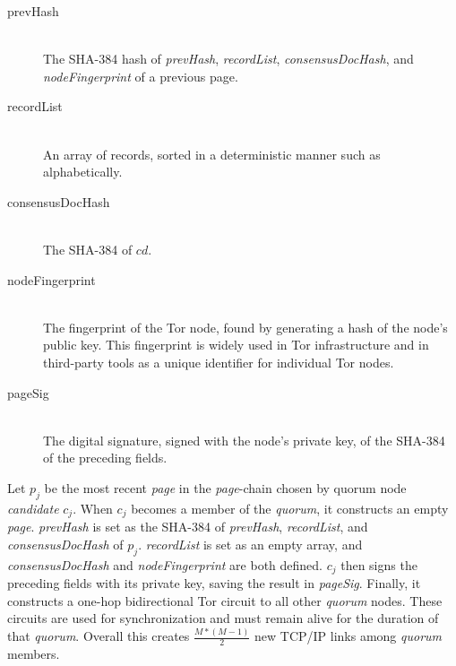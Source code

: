 \begin{description}
	\item[prevHash] \hfill \\
		The SHA-384 hash of \emph{prevHash}, \emph{recordList}, \emph{consensusDocHash}, and \emph{nodeFingerprint} of a previous page.
	\item[recordList] \hfill \\
		An array of records, sorted in a deterministic manner such as alphabetically.
	\item[consensusDocHash] \hfill \\
		The SHA-384 of $ cd $.
	\item[nodeFingerprint] \hfill \\
		The fingerprint of the Tor node, found by generating a hash of the node's public key. This fingerprint is widely used in Tor infrastructure and in third-party tools as a unique identifier for individual Tor nodes.
	\item[pageSig] \hfill \\
		The digital signature, signed with the node's private key, of the SHA-384 of the preceding fields.
\end{description}

Let $ p_{j} $ be the most recent \emph{page} in the \emph{page}-chain chosen by quorum node \emph{candidate} $ c_{j} $. When $ c_{j} $ becomes a member of the \emph{quorum}, it constructs an empty \emph{page}. \emph{prevHash} is set as the SHA-384 of \emph{prevHash}, \emph{recordList}, and \emph{consensusDocHash} of $ p_{j} $. \emph{recordList} is set as an empty array, and \emph{consensusDocHash} and \emph{nodeFingerprint} are both defined. $ c_{j} $ then signs the preceding fields with its private key, saving the result in \emph{pageSig}. Finally, it constructs a one-hop bidirectional Tor circuit to all other \emph{quorum} nodes. These circuits are used for synchronization and must remain alive for the duration of that \emph{quorum}. Overall this creates $ \frac{M * (M - 1)}{2} $ new TCP/IP links among \emph{quorum} members.



